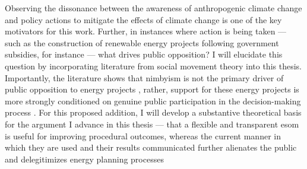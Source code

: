 Observing the dissonance between the awareness of anthropogenic
climate change and policy actions to mitigate the effects of climate change is
one of the key motivators for this work. Further, in instances where action is
being taken --- such as the construction of renewable energy projects following
government subsidies, for instance --- what drives public opposition? I will
elucidate this question by incorporating literature from social movement theory
\cite{mcadam_social_2017,mcadam_putting_2012} into this thesis. Importantly, the
literature shows that \ac{nimbyism} is not the primary driver of public
opposition to energy projects \cite{konisky_proximity_2021}, rather, support for
these energy projects is more strongly conditioned on genuine public
participation in the decision-making process
\cite{summers_influencing_2020,ottinger_procedural_2014,
walker_procedural_2017,barragan-contreras_procedural_2022,gonyo_resident_2021}.
For this proposed addition, I will develop a substantive theoretical basis for
the argument I advance in this thesis --- that a flexible and transparent
\ac{esom} is useful for improving procedural outcomes, whereas the current
manner in which they are used and their results communicated  
further alienates the public \cite{wynne_misunderstood_1992} and delegitimizes
energy planning processes



